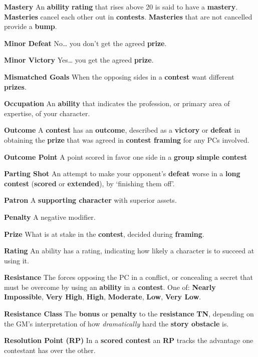 \documentclass[
]{article}
\begin{document}
\textbf{Mastery} An \textbf{ability} \textbf{rating} that rises above 20
is said to have a \textbf{mastery}. \textbf{Masteries} cancel each other
out in \textbf{contests}. \textbf{Masteries} that are not cancelled
provide a \textbf{bump}.

\textbf{Minor Defeat} No\ldots{} you don't get the agreed
\textbf{prize}.

\textbf{Minor Victory} Yes\ldots{} you get the agreed \textbf{prize}.

\textbf{Mismatched Goals} When the opposing sides in a \textbf{contest}
want different \textbf{prizes}.

\textbf{Occupation} An \textbf{ability} that indicates the profession,
or primary area of expertise, of your character.

\textbf{Outcome} A \textbf{contest} has an \textbf{outcome}, described
as a \textbf{victory} or \textbf{defeat} in obtaining the \textbf{prize}
that was agreed in \textbf{contest framing} for any PCs involved.

\textbf{Outcome Point} A point scored in favor one side in a
\textbf{group simple contest}

\textbf{Parting Shot} An attempt to make your opponent's \textbf{defeat}
worse in a \textbf{long contest} (\textbf{scored} or \textbf{extended}),
by `finishing them off'.

\textbf{Patron} A \textbf{supporting character} with superior assets.

\textbf{Penalty} A negative modifier.

\textbf{Prize} What is at stake in the \textbf{contest}, decided during
\textbf{framing}.

\textbf{Rating} An ability has a rating, indicating how likely a
character is to succeed at using it.

\textbf{Resistance} The forces opposing the PC in a conflict, or
concealing a secret that must be overcome by using an \textbf{ability}
in a \textbf{contest}. One of: \textbf{Nearly Impossible}, \textbf{Very
High}, \textbf{High}, \textbf{Moderate}, \textbf{Low}, \textbf{Very
Low}.

\textbf{Resistance Class} The \textbf{bonus} or \textbf{penalty} to the
\textbf{resistance} \textbf{TN}, depending on the GM's interpretation of
how \emph{dramatically} hard the \textbf{story obstacle} is.

\textbf{Resolution Point (RP)} In a \textbf{scored contest} an
\textbf{RP} tracks the advantage one contestant has over the other.
\end{document}
